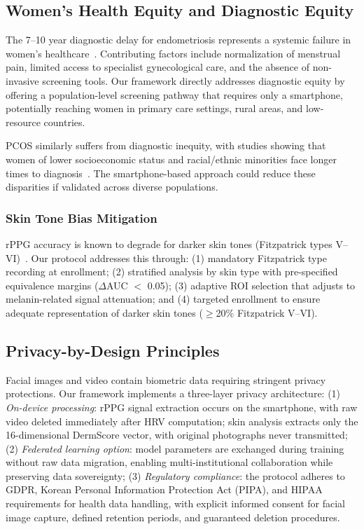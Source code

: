 \documentclass[conference]{IEEEtran}
\begin{document}
\subsection{Women's Health Equity and Diagnostic Equity}

The 7--10 year diagnostic delay for endometriosis represents a systemic failure in women's healthcare~\cite{Pavic_2025, Zhang_2026}. Contributing factors include normalization of menstrual pain, limited access to specialist gynecological care, and the absence of non-invasive screening tools. Our framework directly addresses diagnostic equity by offering a population-level screening pathway that requires only a smartphone, potentially reaching women in primary care settings, rural areas, and low-resource countries.

PCOS similarly suffers from diagnostic inequity, with studies showing that women of lower socioeconomic status and racial/ethnic minorities face longer times to diagnosis~\cite{Arabkermani_2025}. The smartphone-based approach could reduce these disparities if validated across diverse populations.

\subsubsection{Skin Tone Bias Mitigation}
rPPG accuracy is known to degrade for darker skin tones (Fitzpatrick types V--VI)~\cite{Sollee_2025}. Our protocol addresses this through: (1) mandatory Fitzpatrick type recording at enrollment; (2) stratified analysis by skin type with pre-specified equivalence margins ($\Delta$AUC $<$ 0.05); (3) adaptive ROI selection that adjusts to melanin-related signal attenuation; and (4) targeted enrollment to ensure adequate representation of darker skin tones ($\geq$20\% Fitzpatrick V--VI).

\subsection{Privacy-by-Design Principles}

Facial images and video contain biometric data requiring stringent privacy protections. Our framework implements a three-layer privacy architecture: (1) \textit{On-device processing}: rPPG signal extraction occurs on the smartphone, with raw video deleted immediately after HRV computation; skin analysis extracts only the 16-dimensional DermScore vector, with original photographs never transmitted; (2) \textit{Federated learning option}: model parameters are exchanged during training without raw data migration, enabling multi-institutional collaboration while preserving data sovereignty; (3) \textit{Regulatory compliance}: the protocol adheres to GDPR, Korean Personal Information Protection Act (PIPA), and HIPAA requirements for health data handling, with explicit informed consent for facial image capture, defined retention periods, and guaranteed deletion procedures.
\end{document}

